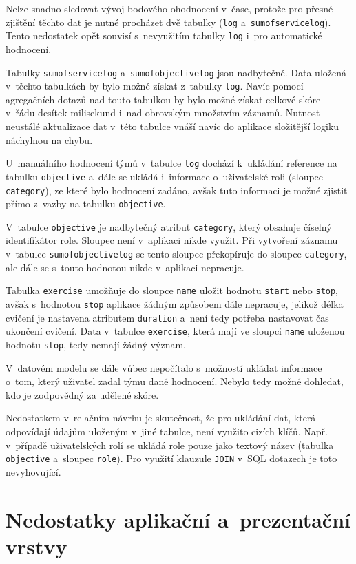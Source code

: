 \documentclass[
  digital,
  twoside,
  table, 
  nolof, 
  nolot
]{fithesis3}
\begin{document}
Nelze snadno sledovat vývoj bodového ohodnocení v~čase, protože pro přesné zjištění těchto dat je nutné procházet dvě tabulky (\texttt{log} a~\texttt{sumofservicelog}). Tento nedostatek opět souvisí s~nevyužitím tabulky \texttt{log} i~pro automatické hodnocení.

Tabulky \texttt{sumofservicelog} a~\texttt{sumofobjectivelog} jsou nadbytečné. Data uložená v~těchto tabulkách by bylo možné získat z~tabulky \texttt{log}. Navíc pomocí agregačních dotazů nad touto tabulkou by bylo možné získat celkové skóre v~řádu desítek milisekund i~nad obrovským množstvím záznamů. Nutnost neustálé aktualizace dat v~této tabulce vnáší navíc do aplikace složitější logiku náchylnou na chybu. 

U~manuálního hodnocení týmů v~tabulce \texttt{log} dochází k~ukládání reference na tabulku \texttt{objective} a~dále se ukládá i~informace o~uživatelské roli (sloupec \texttt{category}), ze které bylo hodnocení zadáno, avšak tuto informaci je možné zjistit přímo z~vazby na tabulku \texttt{objective}.

V~tabulce \texttt{objective} je nadbytečný atribut \texttt{category}, který obsahuje číselný identifikátor role. Sloupec není v~aplikaci nikde využit. Při vytvoření záznamu v~tabulce \texttt{sumofobjectivelog} se tento sloupec překopíruje do sloupce \texttt{category}, ale dále se s~touto hodnotou nikde v~aplikaci nepracuje.

Tabulka \texttt{exercise} umožňuje do sloupce \texttt{name} uložit hodnotu \texttt{start} nebo \texttt{stop}, avšak s~hodnotou \texttt{stop} aplikace žádným způsobem dále nepracuje, jelikož délka cvičení je nastavena atributem \texttt{duration} a~není tedy potřeba nastavovat čas ukončení cvičení. Data v~tabulce \texttt{exercise}, která mají ve sloupci \texttt{name} uloženou hodnotu \texttt{stop}, tedy nemají žádný význam.

V~datovém modelu se dále vůbec nepočítalo s~možností ukládat informace o~tom, který uživatel zadal týmu dané hodnocení. Nebylo tedy možné dohledat, kdo je zodpovědný za udělené skóre.

Nedostatkem v~relačním návrhu je skutečnost, že pro ukládání dat, která odpovídají údajům uloženým v~jiné tabulce, není využito cizích klíčů. Např. v~případě uživatelských rolí se ukládá role pouze jako textový název (tabulka \texttt{objective} a~sloupec \texttt{role}). Pro využití klauzule \texttt{JOIN} v~SQL dotazech je toto nevyhovující.

\section{Nedostatky aplikační a~prezentační vrstvy}
\end{document}
